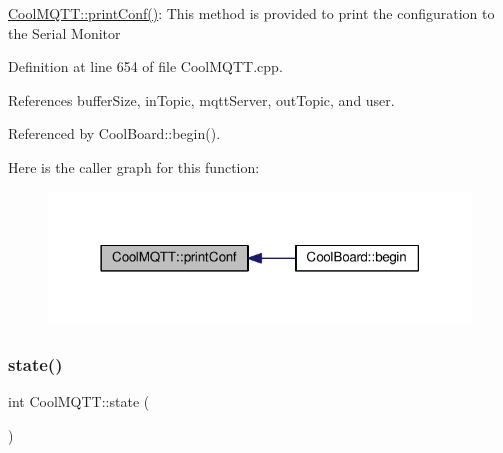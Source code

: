 \hyperlink{class_cool_m_q_t_t_a40553a0ad4b5ecf1cb4411ab54ca85fb}{Cool\+M\+Q\+T\+T\+::print\+Conf()}\+: This method is provided to print the configuration to the Serial Monitor 

Definition at line 654 of file Cool\+M\+Q\+T\+T.\+cpp.



References buffer\+Size, in\+Topic, mqtt\+Server, out\+Topic, and user.



Referenced by Cool\+Board\+::begin().

Here is the caller graph for this function\+:
\nopagebreak
\begin{figure}[H]
\begin{center}
\leavevmode
\includegraphics[width=318pt]{d0/dd0/class_cool_m_q_t_t_a40553a0ad4b5ecf1cb4411ab54ca85fb_icgraph}
\end{center}
\end{figure}
\mbox{\label{class_cool_m_q_t_t_a5d003307eff78efbd585e42b43b72b6d}} 
\subsubsection{\texorpdfstring{state()}{state()}}
{\footnotesize\ttfamily int Cool\+M\+Q\+T\+T\+::state (\begin{DoxyParamCaption}{ }\end{DoxyParamCaption})}

